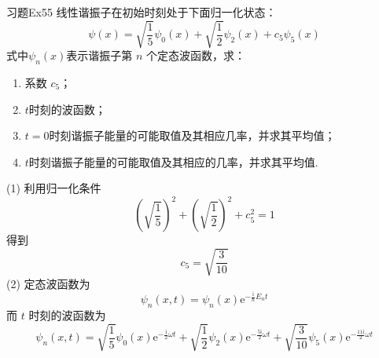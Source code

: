 \begin{question}{习题Ex55}
    线性谐振子在初始时刻处于下面归一化状态：
    $$
        \psi(x)=\sqrt{\frac{1}{5}}\psi_0(x)+\sqrt{\frac{1}{2}}\psi_2(x)+c_5\psi_5(x)
    $$
    式中$\psi_n(x)$表示谐振子第 $n$ 个定态波函数，求：
    \begin{enumerate}
        \item 系数 $c_5$；
        \item $t$时刻的波函数；
        \item $t=0$时刻谐振子能量的可能取值及其相应几率，并求其平均值；
        \item $t$时刻谐振子能量的可能取值及其相应的几率，并求其平均值.
    \end{enumerate}
\end{question}
\begin{solution}
    (1) 利用归一化条件
    $$
        \left(\sqrt{\frac{1}{5}}\right)^2 + \left(\sqrt{\frac{1}{2}}\right)^2 + c_5^2 = 1
    $$
    得到
    $$
        c_5 = \sqrt{\frac{3}{10}}
    $$
    (2) 定态波函数为
    $$
        \psi_n(x, t) = \psi_n(x)\mathrm{e}^{-\frac{\mathrm{i}}{\hbar}E_nt}
    $$
    而 $t$ 时刻的波函数为
    $$
        \psi_n(x, t) = \sqrt{\frac{1}{5}}\psi_0(x)\mathrm{e}^{-\frac{\mathrm{i}}{2}\omega t} + \sqrt{\frac{1}{2}}\psi_2(x)\mathrm{e}^{-\frac{5\mathrm{i}}{2}\omega t} + \sqrt{\frac{3}{10}}\psi_5(x)\mathrm{e}^{-\frac{11\mathrm{i}}{2}\omega t}
    $$
\end{solution}

